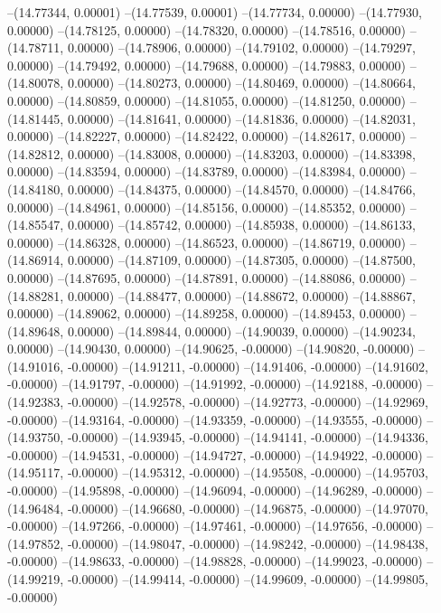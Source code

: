 --(14.77344, 0.00001)
--(14.77539, 0.00001)
--(14.77734, 0.00000)
--(14.77930, 0.00000)
--(14.78125, 0.00000)
--(14.78320, 0.00000)
--(14.78516, 0.00000)
--(14.78711, 0.00000)
--(14.78906, 0.00000)
--(14.79102, 0.00000)
--(14.79297, 0.00000)
--(14.79492, 0.00000)
--(14.79688, 0.00000)
--(14.79883, 0.00000)
--(14.80078, 0.00000)
--(14.80273, 0.00000)
--(14.80469, 0.00000)
--(14.80664, 0.00000)
--(14.80859, 0.00000)
--(14.81055, 0.00000)
--(14.81250, 0.00000)
--(14.81445, 0.00000)
--(14.81641, 0.00000)
--(14.81836, 0.00000)
--(14.82031, 0.00000)
--(14.82227, 0.00000)
--(14.82422, 0.00000)
--(14.82617, 0.00000)
--(14.82812, 0.00000)
--(14.83008, 0.00000)
--(14.83203, 0.00000)
--(14.83398, 0.00000)
--(14.83594, 0.00000)
--(14.83789, 0.00000)
--(14.83984, 0.00000)
--(14.84180, 0.00000)
--(14.84375, 0.00000)
--(14.84570, 0.00000)
--(14.84766, 0.00000)
--(14.84961, 0.00000)
--(14.85156, 0.00000)
--(14.85352, 0.00000)
--(14.85547, 0.00000)
--(14.85742, 0.00000)
--(14.85938, 0.00000)
--(14.86133, 0.00000)
--(14.86328, 0.00000)
--(14.86523, 0.00000)
--(14.86719, 0.00000)
--(14.86914, 0.00000)
--(14.87109, 0.00000)
--(14.87305, 0.00000)
--(14.87500, 0.00000)
--(14.87695, 0.00000)
--(14.87891, 0.00000)
--(14.88086, 0.00000)
--(14.88281, 0.00000)
--(14.88477, 0.00000)
--(14.88672, 0.00000)
--(14.88867, 0.00000)
--(14.89062, 0.00000)
--(14.89258, 0.00000)
--(14.89453, 0.00000)
--(14.89648, 0.00000)
--(14.89844, 0.00000)
--(14.90039, 0.00000)
--(14.90234, 0.00000)
--(14.90430, 0.00000)
--(14.90625, -0.00000)
--(14.90820, -0.00000)
--(14.91016, -0.00000)
--(14.91211, -0.00000)
--(14.91406, -0.00000)
--(14.91602, -0.00000)
--(14.91797, -0.00000)
--(14.91992, -0.00000)
--(14.92188, -0.00000)
--(14.92383, -0.00000)
--(14.92578, -0.00000)
--(14.92773, -0.00000)
--(14.92969, -0.00000)
--(14.93164, -0.00000)
--(14.93359, -0.00000)
--(14.93555, -0.00000)
--(14.93750, -0.00000)
--(14.93945, -0.00000)
--(14.94141, -0.00000)
--(14.94336, -0.00000)
--(14.94531, -0.00000)
--(14.94727, -0.00000)
--(14.94922, -0.00000)
--(14.95117, -0.00000)
--(14.95312, -0.00000)
--(14.95508, -0.00000)
--(14.95703, -0.00000)
--(14.95898, -0.00000)
--(14.96094, -0.00000)
--(14.96289, -0.00000)
--(14.96484, -0.00000)
--(14.96680, -0.00000)
--(14.96875, -0.00000)
--(14.97070, -0.00000)
--(14.97266, -0.00000)
--(14.97461, -0.00000)
--(14.97656, -0.00000)
--(14.97852, -0.00000)
--(14.98047, -0.00000)
--(14.98242, -0.00000)
--(14.98438, -0.00000)
--(14.98633, -0.00000)
--(14.98828, -0.00000)
--(14.99023, -0.00000)
--(14.99219, -0.00000)
--(14.99414, -0.00000)
--(14.99609, -0.00000)
--(14.99805, -0.00000)
